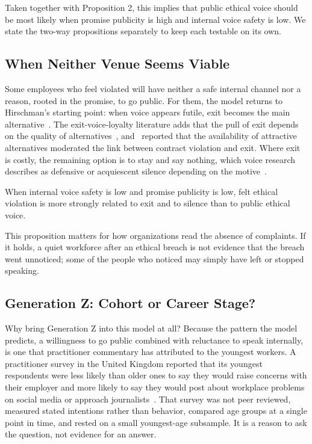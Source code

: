 Taken together with Proposition 2, this implies that public ethical voice should be most likely when promise publicity is high and internal voice safety is low. We state the two-way propositions separately to keep each testable on its own.

\subsection{When Neither Venue Seems Viable}

Some employees who feel violated will have neither a safe internal channel nor a reason, rooted in the promise, to go public. For them, the model returns to Hirschman's starting point: when voice appears futile, exit becomes the main alternative~\citep{hirschman1970exit}. The exit-voice-loyalty literature adds that the pull of exit depends on the quality of alternatives~\citep{rusbult1988impact}, and~\citet{turnley1999impact} reported that the availability of attractive alternatives moderated the link between contract violation and exit. Where exit is costly, the remaining option is to stay and say nothing, which voice research describes as defensive or acquiescent silence depending on the motive~\citep{vandyne2003conceptualizing}.

\begin{proposition}
When internal voice safety is low and promise publicity is low, felt ethical violation is more strongly related to exit and to silence than to public ethical voice.
\end{proposition}

This proposition matters for how organizations read the absence of complaints. If it holds, a quiet workforce after an ethical breach is not evidence that the breach went unnoticed; some of the people who noticed may simply have left or stopped speaking.

\subsection{Generation Z: Cohort or Career Stage?}

Why bring Generation Z into this model at all? Because the pattern the model predicts, a willingness to go public combined with reluctance to speak internally, is one that practitioner commentary has attributed to the youngest workers. A practitioner survey in the United Kingdom reported that its youngest respondents were less likely than older ones to say they would raise concerns with their employer and more likely to say they would post about workplace problems on social media or approach journalists~\citep{protect2025talkin}. That survey was not peer reviewed, measured stated intentions rather than behavior, compared age groups at a single point in time, and rested on a small youngest-age subsample. It is a reason to ask the question, not evidence for an answer.

